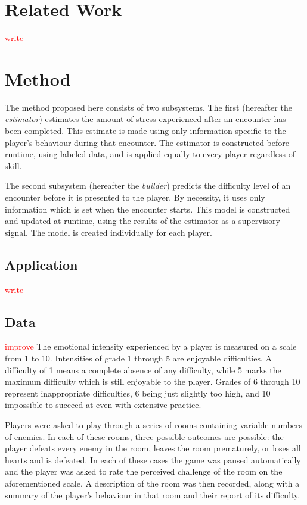 \documentclass[a4paper]{article}
\begin{document}
\begin{multicols*}{2}
\section{Related Work}
\textcolor{red}{write}

\section{Method}
The method proposed here consists of two subsystems. The first (hereafter the \emph{estimator}) estimates the amount of stress experienced after an encounter has been completed. This estimate is made using only information specific to the player's behaviour during that encounter. The estimator is constructed before runtime, using labeled data, and is applied equally to every player regardless of skill.

The second subsystem (hereafter the \emph{builder}) predicts the difficulty level of an encounter before it is presented to the player. By necessity, it uses only information which is set when the encounter starts. This model is constructed and updated at runtime, using the results of the estimator as a supervisory signal. The model is created individually for each player.

\subsection{Application}
\textcolor{red}{write}

\subsection{Data}
\textcolor{red}{improve}
The emotional intensity experienced by a player is measured on a scale from 1 to 10. Intensities of grade 1 through 5 are enjoyable difficulties. A difficulty of 1 means a complete absence of any difficulty, while 5 marks the maximum difficulty which is still enjoyable to the player. Grades of 6 through 10 represent inappropriate difficulties, 6 being just slightly too high, and 10 impossible to succeed at even with extensive practice.

Players were asked to play through a series of rooms containing variable numbers of enemies. In each of these rooms, three possible outcomes are possible: the player  defeats every enemy in the room, leaves the room prematurely, or loses all hearts and is defeated. In each of these cases the game was paused automatically and the player was asked to rate the perceived challenge of the room on the aforementioned scale. A description of the room was then recorded, along with a summary of the player's behaviour in that room and their report of its difficulty.


\end{multicols*}
\end{document}
